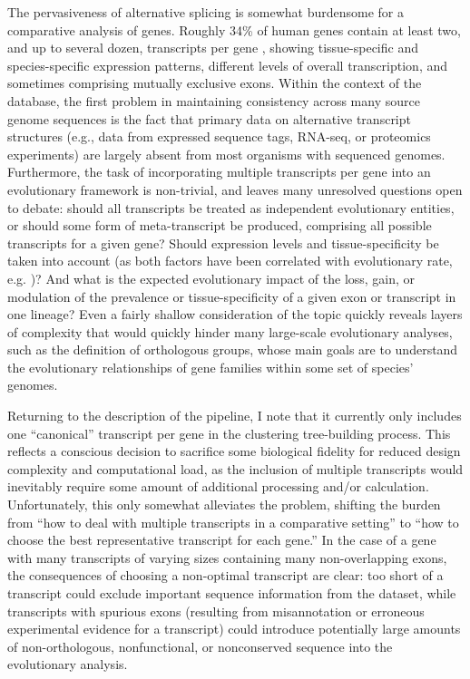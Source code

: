 
The pervasiveness of alternative splicing is somewhat burdensome for a
comparative analysis of genes. Roughly 34\% of human genes contain at
least two, and up to several dozen, transcripts per gene
\citep{Mironov1999}, showing tissue-specific and species-specific
expression patterns, different levels of overall transcription, and
sometimes comprising mutually exclusive exons. Within the context of
the \cmp database, the first problem in maintaining consistency across
many source genome sequences is the fact that primary data on
alternative transcript structures (e.g., data from expressed sequence
tags, RNA-seq, or proteomics experiments) are largely absent from most
organisms with sequenced genomes. Furthermore, the task of
incorporating multiple transcripts per gene into an evolutionary
framework is non-trivial, and leaves many unresolved questions open to
debate: should all transcripts be treated as independent evolutionary
entities, or should some form of meta-transcript be produced,
comprising all possible transcripts for a given gene? Should
expression levels and tissue-specificity be taken into account (as
both factors have been correlated with evolutionary rate,
e.g. \citep{Koonin2006a,Zhu2008})? And what is the expected
evolutionary impact of the loss, gain, or modulation of the prevalence
or tissue-specificity of a given exon or transcript in one lineage?
Even a fairly shallow consideration of the topic quickly reveals
layers of complexity that would quickly hinder many large-scale
evolutionary analyses, such as the definition of orthologous groups,
whose main goals are to understand the evolutionary relationships of
gene families within some set of species' genomes.

Returning to the description of the \cmp pipeline, I note that it
currently only includes one ``canonical'' transcript per gene in the
clustering tree-building process. This reflects a conscious decision
to sacrifice some biological fidelity for reduced design complexity
and computational load, as the inclusion of multiple transcripts would
inevitably require some amount of additional processing and/or
calculation. Unfortunately, this only somewhat alleviates the problem,
shifting the burden from ``how to deal with multiple transcripts in a
comparative setting'' to ``how to choose the best representative
transcript for each gene.'' In the case of a gene with many
transcripts of varying sizes containing many non-overlapping exons,
the consequences of choosing a non-optimal transcript are clear: too
short of a transcript could exclude important sequence information
from the dataset, while transcripts with spurious exons (resulting
from misannotation or erroneous experimental evidence for a
transcript) could introduce potentially large amounts of
non-orthologous, nonfunctional, or nonconserved sequence into the
evolutionary analysis.


